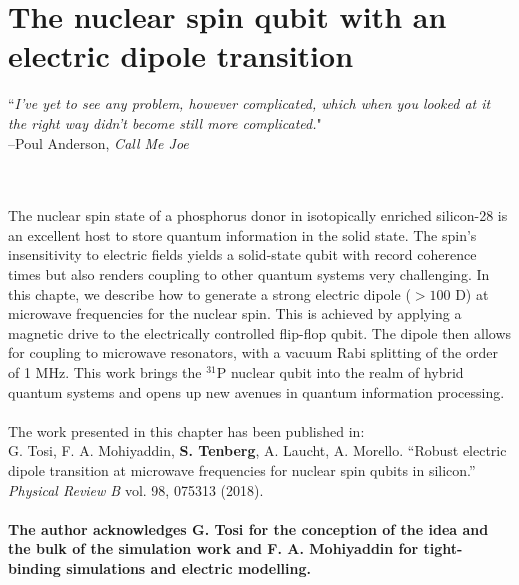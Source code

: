 
\chapter{The nuclear spin qubit with an electric dipole transition} %

\label{Chapter3} 

\noindent\hrulefill
\vspace{0.5cm} %
\begin{flushright}
        ``\emph{I’ve yet to see any problem, however complicated, which when you looked at it the right way didn’t become still more complicated.}"
\\ 
--Poul Anderson, \textit{Call Me Joe} \\
\end{flushright}

\vspace{0.5cm}


\noindent\hrulefill
\vspace{0.5cm} %
\\
\hangindent=4cm
\\
The nuclear spin state of a phosphorus donor in isotopically enriched silicon-28 is an excellent host to store quantum information in the solid state. The spin's insensitivity to electric fields yields a solid-state qubit with record coherence times but also renders coupling to other quantum systems very challenging. In this chapte, we describe how to generate a strong electric dipole ($>100$ D) at microwave frequencies for the nuclear spin. This is achieved by applying a magnetic drive to the electrically controlled flip-flop qubit. The dipole then allows for coupling to microwave resonators, with a vacuum Rabi splitting of the order of 1 MHz. This work brings the $^{31}$P nuclear qubit into the realm of hybrid quantum systems and opens up new avenues in quantum information processing.
\\ \\
\scriptsize
\hangindent=4cm
The work presented in this chapter has been published in:\\
G. Tosi, F. A. Mohiyaddin, \textbf{S. Tenberg}, A. Laucht, A. Morello. ``Robust electric dipole transition at microwave frequencies for nuclear spin qubits in silicon.'' \textit{Physical Review B} vol. 98, 075313 (2018).\\
\\
\footnotesize
\hangindent=4cm
\textbf{The author acknowledges G. Tosi for the conception of the idea and the bulk of the simulation work and F. A. Mohiyaddin for tight-binding simulations and electric modelling.}\\

